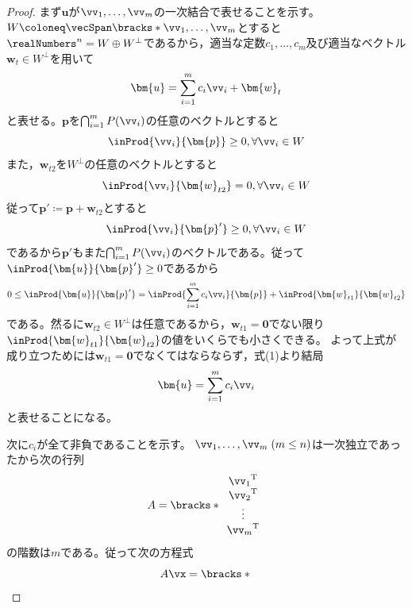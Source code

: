         \begin{proof}
            まず$\bm{u}$が$\vv_1,\dotsc,\vv_m$の一次結合で表せることを示す。\\
            $W \coloneq \vecSpan\bracks*{\vv_1,\dotsc,\vv_m}$とすると$\realNumbers^n = W\oplus W^\bot$であるから，適当な定数$c_1,\dotsc,c_m$及び適当なベクトル$\bm{w}_t\in W^\bot$を用いて
            \begin{equation}
                \bm{u} = \sum_{i=1}^{m}{c_i\vv_i} + \bm{w}_t
            \end{equation}
            と表せる。$\bm{p}$を$\bigcap_{i=1}^{m}{P(\vv_i)}$の任意のベクトルとすると
            \[\inProd{\vv_i}{\bm{p}}\geq0,\forall\vv_i\in W\]
            また，$\bm{w}_{t2}$を$W^\bot$の任意のベクトルとすると
            \[\inProd{\vv_i}{\bm{w}_{t2}}=0,\forall\vv_i\in W\]
            従って$\bm{p}' \coloneq \bm{p}+\bm{w}_{t2}$とすると
            \[\inProd{\vv_i}{\bm{p}'}\geq0,\forall\vv_i\in W\]
            であるから$\bm{p'}$もまた$\bigcap_{i=1}^{m}{P(\vv_i)}$のベクトルである。従って$\inProd{\bm{u}}{\bm{p}'}\geq0$であるから
            \[0\leq\inProd{\bm{u}}{\bm{p}'} = \inProd{\sum_{i=1}^{m}{c_i\vv_i}}{\bm{p}} + \inProd{\bm{w}_{t1}}{\bm{w}_{t2}}\]
            である。然るに$\bm{w}_{t2}\in W^\bot$は任意であるから，$\bm{w}_{t1}=\bm{0}$でない限り$\inProd{\bm{w}_{t1}}{\bm{w}_{t2}}$の値をいくらでも小さくできる。
            よって上式が成り立つためには$\bm{w}_{t1}=\bm{0}$でなくてはならならず，式(1)より結局
            \[\bm{u} = \sum_{i=1}^{m}{c_i\vv_i}\]
            と表せることになる。
            \par
            次に$c_i$が全て非負であることを示す。%
            $\vv_1,\dotsc,\vv_m\;(m\leq n)$は一次独立であったから次の行列
            \[
                A = \bracks*{
                    \begin{array}{c}
                        {\vv_1}^\mathrm{T}\\
                        {\vv_2}^\mathrm{T}\\
                        \vdots\\
                        {\vv_m}^\mathrm{T}
                    \end{array}
                }
            \]
            の階数は$m$である。従って次の方程式
            \[
                A\vx = \bracks*{
                    \begin{array}{c}

\end{array}}\]
\end{proof}
